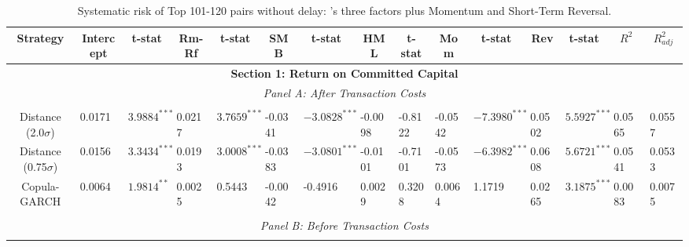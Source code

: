 \documentclass[a4paper]{article}
\begin{document}
	\begin{sidewaystable}
		\caption{Systematic risk of Top 101-120 pairs without delay: \citet*{ff93}'s three factors plus Momentum and Short-Term Reversal.}
		\begin{threeparttable}[H]
			\centering \scriptsize
			\begin{tabularx}{\textwidth}{@{\extracolsep{\fill}}lllllllllllllll@{}}
				\toprule
				\multicolumn{1}{c}{Strategy} & \multicolumn{1}{c}{Intercept} & \multicolumn{1}{c}{t-stat} & \multicolumn{1}{c}{Rm-Rf} & \multicolumn{1}{c}{t-stat} & \multicolumn{1}{c}{SMB} & \multicolumn{1}{c}{t-stat} & \multicolumn{1}{c}{HML} & \multicolumn{1}{c}{t-stat} & \multicolumn{1}{c}{Mom} & \multicolumn{1}{c}{t-stat} & \multicolumn{1}{c}{Rev} & \multicolumn{1}{c}{t-stat} & \multicolumn{1}{c}{$R^{2}$} & \multicolumn{1}{c}{$R^{2}_{adj}$} \\
				\midrule
				\multicolumn{15}{c}{\textbf{Section 1: Return on Committed Capital}} \\
				\multicolumn{15}{c}{\textit{Panel A: After Transaction Costs}} \\
				\multicolumn{1}{c}{} & \multicolumn{1}{c}{} & \multicolumn{1}{c}{} & \multicolumn{1}{c}{} & \multicolumn{1}{c}{} & \multicolumn{1}{c}{} & \multicolumn{1}{c}{} & \multicolumn{1}{c}{} &       &       &       &       &       &       &  \\
				\multicolumn{1}{c}{Distance (2.0$\sigma$)} & 0.0171 & $3.9884^{***}$ & 0.0217 & $3.7659^{***}$ & -0.0341 & $-3.0828^{***}$ & -0.0098 & -0.8122 & -0.0542 & $-7.3980^{***}$ & 0.0502 & $5.5927^{***}$ & 0.0565 & 0.0557 \\
				\multicolumn{1}{c}{Distance (0.75$\sigma$)} & 0.0156 & $3.3434^{***}$ & 0.0193 & $3.0008^{***}$ & -0.0383 & $-3.0801^{***}$ & -0.0101 & -0.7101 & -0.0573 & $-6.3982^{***}$ & 0.0608 & $5.6721^{***}$ & 0.0541 & 0.0533  \\
				\multicolumn{1}{c}{Copula-GARCH} & 0.0064 & $1.9814^{**}$ & 0.0025 & 0.5443 & -0.0042 & -0.4916 & 0.0029 & 0.3208 & 0.0064 & 1.1719 & 0.0265 & $3.1875^{***}$ & 0.0083 & 0.0075  \\
				&       &       &       &       &       &       &       &       &       &       &       &       &       &  \\
				\multicolumn{15}{c}{\textit{Panel B: Before Transaction Costs}} \\
				&       &       &       &       &       &       &       &       &       &       &       &       &       &  \\

\end{tabularx}
\end{threeparttable}
\end{sidewaystable}
\end{document}
